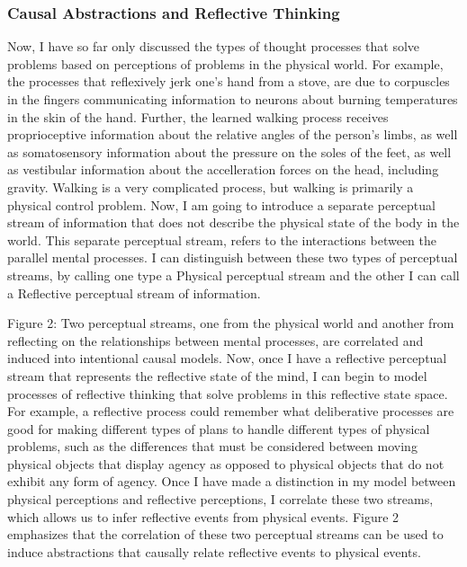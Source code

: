 \subsubsection{Causal Abstractions and Reflective Thinking}

Now, I have so far only discussed the types of thought processes that
solve problems based on perceptions of problems in the physical
world. For example, the processes that reflexively jerk one's hand
from a stove, are due to corpuscles in the fingers communicating
information to neurons about burning temperatures in the skin of the
hand. Further, the learned walking process receives proprioceptive
information about the relative angles of the person's limbs, as well
as somatosensory information about the pressure on the soles of the
feet, as well as vestibular information about the accelleration forces
on the head, including gravity. Walking is a very complicated process,
but walking is primarily a physical control problem. Now, I am going
to introduce a separate perceptual stream of information that does not
describe the physical state of the body in the world. This separate
perceptual stream, refers to the interactions between the parallel
mental processes. I can distinguish between these two types of
perceptual streams, by calling one type a Physical perceptual stream
and the other I can call a Reflective perceptual stream of
information.

Figure 2: Two perceptual streams, one from the physical world and
another from reflecting on the relationships between mental processes,
are correlated and induced into intentional causal models.  Now, once
I have a reflective perceptual stream that represents the reflective
state of the mind, I can begin to model processes of reflective
thinking that solve problems in this reflective state space. For
example, a reflective process could remember what deliberative
processes are good for making different types of plans to handle
different types of physical problems, such as the differences that
must be considered between moving physical objects that display agency
as opposed to physical objects that do not exhibit any form of
agency. Once I have made a distinction in my model between physical
perceptions and reflective perceptions, I correlate these two
streams, which allows us to infer reflective events from physical
events. Figure 2 emphasizes that the correlation of these two
perceptual streams can be used to induce abstractions that causally
relate reflective events to physical events.

